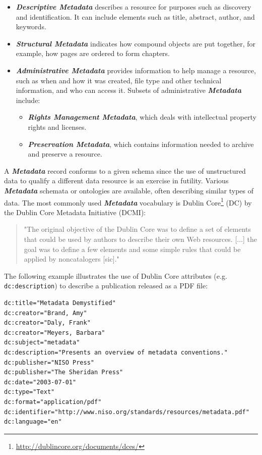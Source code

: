 \documentclass[a4paper,english,twoside,BCOR1.5cm,headsepline,DIV12,appendixprefix,final,12pt]{scrbook}
\newcommand{\prop}[1]{{{\texttt{#1}}}}
\newcommand{\important}[1]{\textbf{\textit{#1}}}
\newcommand\footnoteurl[1]{\footnote{\scriptsize\url{#1}}}
\begin{document}
\begin{itemize}
\item \important{Descriptive Metadata} describes a resource for purposes such as discovery and identification. It can include elements such as title, abstract, author, and keywords. 
\item \important{Structural Metadata} indicates how compound objects are put together, for example, how pages are ordered to form chapters.
\item \important{Administrative Metadata} provides information to help manage a resource, such as when and how it was created, file type and other technical information, and who can access it. Subsets of administrative \important{Metadata} include:
\begin{itemize}
\item \important{Rights Management Metadata}, which deals with intellectual property rights and licenses.
\item \important{Preservation Metadata}, which contains information needed to archive and preserve a resource.
\end{itemize}
\end{itemize}

A \important{Metadata} record conforms to a given schema since the use of unstructured data to qualify a different data resource is an exercise in futility. Various \important{Metadata} schemata or ontologies are available, often describing similar types of data. The most commonly used \important{Metadata} vocabulary is Dublin Core\footnoteurl{http://dublincore.org/documents/dces/} (DC) by the Dublin Core Metadata Initiative (DCMI):

\begin{quote}
"The original objective of the
Dublin Core was to define a set of
elements that could be used by
authors to describe their own Web
resources. [...] the goal was to define a
few elements and some simple
rules that could be applied by
noncatalogers [sic]." \cite{NISO2004}
\end{quote}

The following example illustrates the use of Dublin Core attributes (e.g. \prop{dc:description}) to describe a publication released as a PDF file:

\begin{lstlisting}[language=ttl, captionpos=b, caption=Dublin Core example, label=lst:dcex,linewidth=\columnwidth,breaklines=true]
dc:title="Metadata Demystified"
dc:creator="Brand, Amy"
dc:creator="Daly, Frank"
dc:creator="Meyers, Barbara"
dc:subject="metadata"
dc:description="Presents an overview of metadata conventions."
dc:publisher="NISO Press"
dc:publisher="The Sheridan Press"
dc:date="2003-07-01"
dc:type="Text"
dc:format="application/pdf"
dc:identifier="http://www.niso.org/standards/resources/metadata.pdf"
dc:language="en"
\end{lstlisting}
\end{document}
